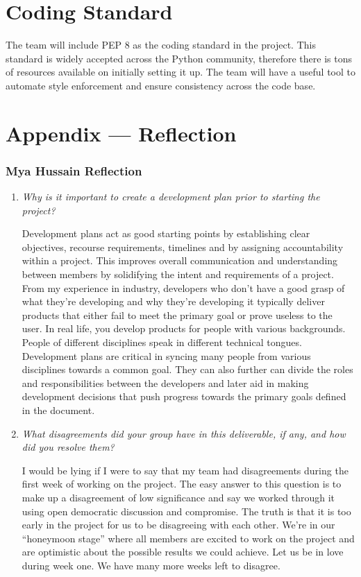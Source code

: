 \documentclass{article}
\begin{document}
\section{Coding Standard}

The team will include PEP 8 as the coding standard in the project. This standard is widely accepted across the Python community, therefore there is tons of resources available on initially setting it up. The team will have a useful tool to automate style enforcement and ensure consistency across the code base.

\newpage{}

\section*{Appendix --- Reflection}

\subsubsection*{Mya Hussain Reflection}

\begin{enumerate}
  \item \textit{Why is it important to create a development plan prior to starting the project?}

    Development plans act as good starting points by establishing clear objectives, recourse requirements, timelines and by
    assigning accountability within a project. This improves overall communication and understanding between members by solidifying
    the intent and requirements of a project. From my experience in industry, developers who don’t have a good grasp of what they’re
    developing and why they’re developing it typically deliver products that either fail to meet the primary goal or prove useless to
    the user. In real life, you develop products for people with various backgrounds. People of different disciplines speak in different
    technical tongues. Development plans are critical in syncing many people from various disciplines towards a common goal. They can also
    further can divide the roles and responsibilities between the developers and later aid in making development decisions that push
    progress towards the primary goals defined in the document.

  \item \textit{What disagreements did your group have in this deliverable, if any, and how did you resolve them?}

    I would be lying if I were to say that my team had disagreements during the first week of working on the project. The easy answer to
    this question is to make up a disagreement of low significance and say we worked through it using open democratic discussion and
    compromise. The truth is that it is too early in the project for us to be disagreeing with each other. We’re in our “honeymoon stage”
    where all members are excited to work on the project and are optimistic about the possible results we could achieve. Let us be in love
    during week one. We have many more weeks left to disagree.

\end{enumerate}
\end{document}
